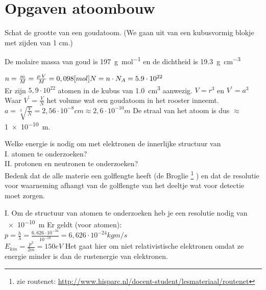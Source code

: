 \section{Opgaven atoombouw}
\begin{questions}
\question
Schat de grootte van een goudatoom. (We gaan uit van een kubusvormig blokje met 
zijden van 1 cm.)

\begin{figure}[h]
\end{figure}

De molaire massa van goud is \SI{197}{\gram\per\mol} en de dichtheid is 
\SI{19.3}{\gram\per\cubic\centi\meter}


$n = \frac{m}{M} = \frac{\rho \cdot V}{M} = 0,098 [mol]\\
N = n \cdot N_{A} = 5.9\cdot10^{22}$ \\
Er zijn $5,9\cdot 10^{22}$ atomen in de kubus van \SI{1.0}{\cubic\centi\meter} aanwezig.
$V = r^3 $ en $V^{'} = a^{3}$ \\Waar $V^{'} = \frac{V}{N}$ het volume wat een goudatoom in het rooster inneemt.\\
$a = \sqrt[3]{\frac{V}{N}} = 2,56\cdot 10^{-8} cm \approx 2,6 \cdot 10^{-10} m$
De straal van het atoom is dus $\approx$ \SI{1e-10}{\meter}.

\question
Welke energie is nodig om met elektronen de innerlijke structuur van \\
I. atomen te onderzoeken?\\

II. protonen en neutronen te onderzoeken?\\
Bedenk dat de alle materie een golflengte heeft (de Broglie \footnote{zie routenet: \url{http://www.hisparc.nl/docent-student/lesmateriaal/routenet}}
) en dat de resolutie voor waarneming afhangt van de golflengte van het deeltje wat voor detectie moet zorgen.

I. Om de structuur van atomen te onderzoeken heb je een resolutie nodig van \SI{e-10}{\meter}
Er geldt (voor atomen):\\
$p = \frac{h}{\lambda} = \frac{6,626\cdot 10^{-34}}{10^{-10}} = 6,626 \cdot 10^{-24} kgm/s$\\
$E_{kin} = \frac{p^2}{2m} = 150 eV$
Het gaat hier om niet relativistische elektronen omdat ze energie minder is dan de rustenergie van elektronen.


\end{questions}

